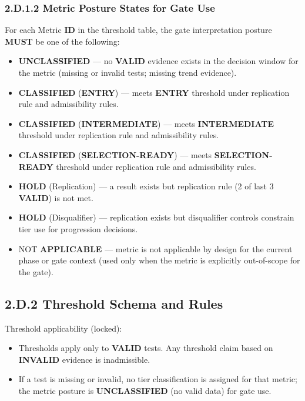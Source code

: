 \documentclass[10pt]{article}
\begin{document}
\subsubsection*{2.D.1.2 Metric Posture States for Gate Use}

For each Metric \textbf{ID} in the threshold table, the gate interpretation posture \textbf{MUST} be one of the following:

\begin{itemize}
\item \textbf{UNCLASSIFIED} — no \textbf{VALID} evidence exists in the decision window for the metric (missing or invalid tests; missing trend evidence).
\item \textbf{CLASSIFIED} (\textbf{ENTRY}) — meets \textbf{ENTRY} threshold under replication rule and admissibility rules.
\item \textbf{CLASSIFIED} (\textbf{INTERMEDIATE}) — meets \textbf{INTERMEDIATE} threshold under replication rule and admissibility rules.
\item \textbf{CLASSIFIED} (\textbf{SELECTION-READY}) — meets \textbf{SELECTION-READY} threshold under replication rule and admissibility rules.
\item \textbf{HOLD} (Replication) — a result exists but replication rule (2 of last 3 \textbf{VALID}) is not met.
\item \textbf{HOLD} (Disqualifier) — replication exists but disqualifier controls constrain tier use for progression decisions.
\item NOT \textbf{APPLICABLE} — metric is not applicable by design for the current phase or gate context (used only when the metric is explicitly out-of-scope for the gate).
\end{itemize}
\clearpage
\subsection*{2.D.2 Threshold Schema and Rules}
{}

Threshold applicability (locked):

\begin{itemize}
\item Thresholds apply only to \textbf{VALID} tests. Any threshold claim based on \textbf{INVALID} evidence is inadmissible.
\item If a test is missing or invalid, no tier classification is assigned for that metric; the metric posture is \textbf{UNCLASSIFIED} (no valid data) for gate use.
\end{itemize}
\end{document}
